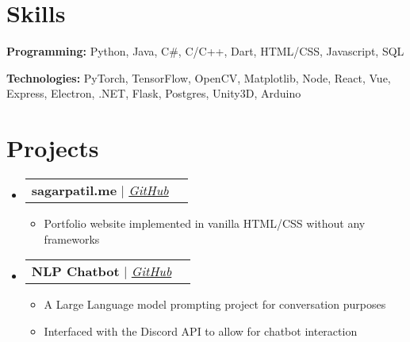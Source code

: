 \documentclass[letterpaper,11pt]{article}
\makeatletter
\newcommand{\resumeItem}[1]{
  \item\small{
    {#1 \vspace{-2pt}}
  }
}
\newcommand{\resumeProjectHeading}[2]{
    \vspace{-2pt}\item
    \begin{tabular*}{0.97\textwidth}{l@{\extracolsep{\fill}}r}
      \small#1 & #2 \\
    \end{tabular*}\vspace{-7pt}
}
\newcommand{\resumeSubHeadingListStart}{\begin{itemize}[leftmargin=0.15in, label={}]}
\newcommand{\resumeSubHeadingListEnd}{\end{itemize}}
\newcommand{\resumeItemListStart}{\begin{itemize}}
\newcommand{\resumeItemListEnd}{\end{itemize}\vspace{-5pt}}
\makeatother
\begin{document}

\section{Skills}
\vspace{2pt}
\resumeSubHeadingListStart
\small{\item{
              \textbf{Programming: }{Python, Java, C\#, C/C++, Dart, HTML/CSS, Javascript, SQL} \\ \vspace{3pt}

              \textbf{Technologies: }{PyTorch, TensorFlow, OpenCV, Matplotlib, Node, React, Vue, Express, Electron, .NET, Flask, Postgres, Unity3D, Arduino} \\ \vspace{3pt}

        }}
\resumeSubHeadingListEnd


\section{Projects}
\vspace{3pt}
\resumeSubHeadingListStart

\resumeProjectHeading
{\textbf{sagarpatil.me} $|$ \emph{\href{https://github.com/sagarreddypatil/portfolio-website}{\color{blue}GitHub}}}{}
\resumeItemListStart
\resumeItem{Portfolio website implemented in vanilla HTML/CSS without any frameworks}
\resumeItemListEnd

\resumeProjectHeading
{\textbf{NLP Chatbot} $|$ \emph{\href{https://github.com/sagarreddypatil/nlp-chatbot}{\color{blue}GitHub}}}{}
\resumeItemListStart
\resumeItem{A Large Language model prompting project for conversation purposes}
\resumeItem{Interfaced with the Discord API to allow for chatbot interaction}
\resumeItemListEnd


\resumeSubHeadingListEnd


\end{document}
